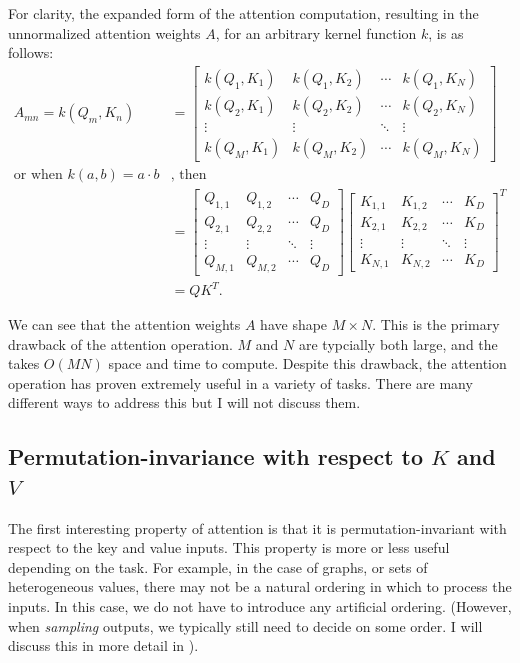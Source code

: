 For clarity, the expanded form of the attention computation, resulting in the unnormalized attention weights $A$, for an arbitrary kernel function $k$, is as follows:
\begin{align*}
A_{mn} = k(Q_m, K_n)
&= \begin{bmatrix}
    k(Q_{1}, K_{1}) & k(Q_{1}, K_{2}) & \cdots & k(Q_{1}, K_{N}) \\
    k(Q_{2}, K_{1}) & k(Q_{2}, K_{2}) & \cdots & k(Q_{2}, K_{N}) \\
    \vdots & \vdots & \ddots & \vdots \\
    k(Q_{M}, K_{1}) & k(Q_{M}, K_{2}) & \cdots & k(Q_{M}, K_{N})
\end{bmatrix} \\
\text{or when\ } k(a, b) = a \cdot b &\text{, then} \\
&= \begin{bmatrix}
    Q_{1,1} & Q_{1,2} & \cdots & Q_D \\
    Q_{2,1} & Q_{2,2} & \cdots & Q_D \\
    \vdots & \vdots & \ddots & \vdots \\
    Q_{M,1} & Q_{M,2} & \cdots & Q_D
\end{bmatrix} \begin{bmatrix}
    K_{1,1} & K_{1,2} & \cdots & K_D \\
    K_{2,1} & K_{2,2} & \cdots & K_D \\
    \vdots & \vdots & \ddots & \vdots \\
    K_{N,1} & K_{N,2} & \cdots & K_D
\end{bmatrix}^T \\
&= Q K^T .
\end{align*}

We can see that the attention weights $A$ have shape $M×N$. This is the primary drawback of the attention operation. $M$ and $N$ are typcially both large, and the takes $O(MN)$ space and time to compute. Despite this drawback, the attention operation has proven extremely useful in a variety of tasks. There are many different ways to address this but I will not discuss them.

\subsection{Permutation-invariance with respect to $K$ and $V$}

The first interesting property of attention is that it is permutation-invariant with respect to the key and value inputs. This property is more or less useful depending on the task. For example, in the case of graphs, or sets of heterogeneous values, there may not be a natural ordering in which to process the inputs. In this case, we do not have to introduce any artificial ordering. (However, when \textit{sampling} outputs, we typically still need to decide on some order. I will discuss this in more detail in ).

